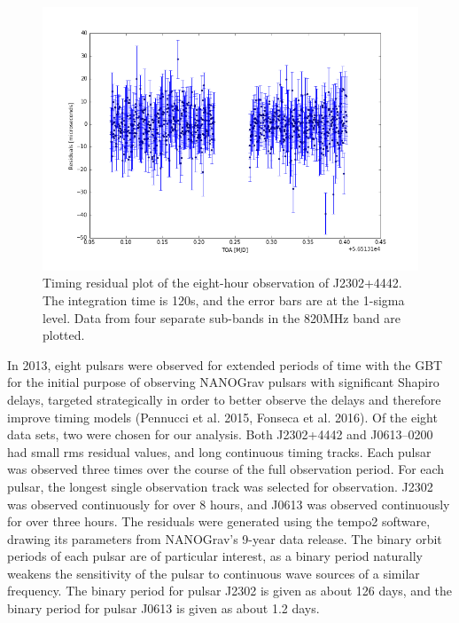 \documentclass[12pt]{article}
\begin{document}
\begin{figure}[h!]
    \caption{Timing residual plot of the eight-hour observation of J2302+4442. The
integration time is 120s, and the error bars are at the 1-sigma level. Data from
four separate sub-bands in the 820MHz band are plotted.}
    \includegraphics[width=\textwidth]{./figures/J2302_residuals.png}
\end{figure}

   In 2013, eight pulsars were observed for extended periods of time with the GBT for the
initial purpose of observing NANOGrav pulsars with significant Shapiro delays,
targeted strategically in order to better observe the delays and therefore
improve timing models (Pennucci et al. 2015, Fonseca et al. 2016). 
Of the eight data sets, two were chosen for our
analysis. Both J2302+4442 and J0613--0200 had small rms residual values, and
long continuous timing tracks.  Each pulsar was observed three times over the
course of the full observation period.  For each pulsar, the longest single
observation track was selected for observation. J2302 was observed continuously
for over 8 hours, and J0613 was observed continuously for over three hours.
The residuals were generated using the tempo2 software, drawing its parameters
from NANOGrav's 9-year data release. The binary orbit periods of each pulsar
are of particular interest, as a binary period naturally weakens the
sensitivity of the pulsar to continuous wave sources of a similar frequency.
The binary period for pulsar J2302 is given as about 126 days, and the binary
period for pulsar J0613 is given as about 1.2 days.
\end{document}
